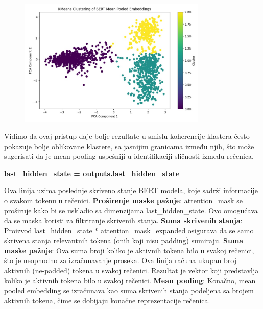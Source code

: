 \documentclass{article}
\begin{document}
\vspace{3em}
\begin{figure}[h]
    \centering 
    \includegraphics[width=0.8\textwidth]{ri6.jpeg} 
\end{figure}

Vidimo da ovaj pristup daje bolje rezultate u smislu koherencije klastera
često pokazuje bolje oblikovane klastere, sa jasnijim granicama između njih, što može sugerisati da je mean pooling uspešniji u identifikaciji sličnosti između rečenica.

\newline
\newline

\textbf{last\_hidden\_state = outputs.last\_hidden\_state}

Ova linija uzima poslednje skriveno stanje BERT modela, koje sadrži informacije o svakom tokenu u rečenici.
\newline
\newline
\textbf{Proširenje maske pažnje}: attention\_mask se proširuje kako bi se uskladio sa dimenzijama last\_hidden\_state. Ovo omogućava da se maska koristi za filtriranje skrivenih stanja.
\newline
\newline
\textbf{Suma skrivenih stanja}: Proizvod last\_hidden\_state * attention\_mask\_expanded osigurava da se samo skrivena stanja relevantnih tokena (onih koji nisu padding) sumiraju.
\newline
\newline
\textbf{Suma maske pažnje}: Ova suma broji koliko je aktivnih tokena bilo u svakoj rečenici, što je neophodno za izračunavanje proseka. Ova linija računa ukupan broj aktivnih (ne-padded) tokena u svakoj rečenici. Rezultat je vektor koji predstavlja koliko je aktivnih tokena bilo u svakoj rečenici.
\newline
\newline
\textbf{Mean pooling}: Konačno, mean pooled embedding se izračunava kao suma skrivenih stanja podeljena sa brojem aktivnih tokena, čime se dobijaju konačne reprezentacije rečenica.
\end{document}
